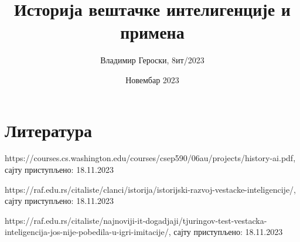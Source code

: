 \documentclass[11pt, a4paper]{article}
\title{Историја вештачке интелигенције и примена}
\author{Владимир Героски, 8ит/2023}
\date{Новембар 2023}
\begin{document}
\maketitle





\section*{Литература}

\noindent [1] https://courses.cs.washington.edu/courses/csep590/06au/projects/history-ai.pdf, сајту приступљено: 18.11.2023

\noindent [2] https://raf.edu.rs/citaliste/clanci/istorija/istorijski-razvoj-vestacke-inteligencije/, сајту приступљено: 18.11.2023

\noindent [3] https://raf.edu.rs/citaliste/najnoviji-it-dogadjaji/tjuringov-test-vestacka-inteligencija-jos-nije-pobedila-u-igri-imitacije/, сајту приступљено: 18.11.2023


\end{document}
